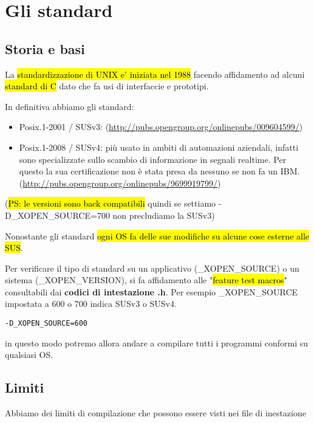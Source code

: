 \newpage
\section{Gli standard}

\subsection{Storia e basi}

La \hl{standardizzazione di UNIX e' iniziata nel 1988} facendo affidamento ad alcuni \hl{standard di C} dato che fa usi di interfaccie e prototipi.

In definitiva abbiamo gli standard:

\begin{itemize}
	\item Posix.1-2001 / SUSv3: (\url{http://pubs.opengroup.org/onlinepubs/009604599/})
	\item Posix.1-2008 / SUSv4:  più usato in ambiti di automazioni aziendali, infatti sono specializzate sullo scambio di informazione in segnali realtime. Per questo la sua certificazione non è stata presa da nessuno se non fa un IBM. (\url{http://pubs.opengroup.org/onlinepubs/9699919799/})
\end{itemize}

(\hl{PS: le versioni sono back compatibili} quindi se settiamo -D\_XOPEN\_SOURCE=700 non precludiamo la SUSv3)

Nonostante gli standard \hl{ogni OS fa delle sue modifiche su alcune cose esterne alle SUS}.

Per verificare il tipo di standard su un applicativo (\_XOPEN\_SOURCE) o un sistema (\_XOPEN\_VERSION), si fa affidamento alle "\hl{feature test macros}" consultabili dai \textbf{codici di intestazione .h}. Per esempio \_XOPEN\_SOURCE impostata a 600 o 700 indica SUSv3 o SUSv4.

\begin{lstlisting}
-D_XOPEN_SOURCE=600
\end{lstlisting}

in questo modo potremo allora andare a compilare tutti i programmi conformi su qualsiasi OS.


\subsection{Limiti}

Abbiamo dei limiti di compilazione che possono essere visti nei file di inestazione

